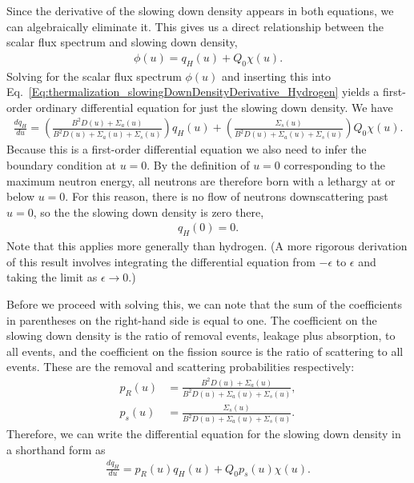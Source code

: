 Since the derivative of the slowing down density appears in both equations, we can algebraically eliminate it. This gives us a direct relationship between the scalar flux spectrum and slowing down density,
\begin{align}
  [ B^2 D(u) + \Sigma_a(u) + \Sigma_s(u) ] \phi(u) = q_H(u) + Q_0 \chi(u) . \label{Eq:thermalization_relationship_ScalarFlux_SlowingDownDensity_Hydrogen}
\end{align}
Solving for the scalar flux spectrum $\phi(u)$ and inserting this into Eq.~\eqref{Eq:thermalization_slowingDownDensityDerivative_Hydrogen} yields a first-order ordinary differential equation for just the slowing down density. We have
\begin{align}
  \frac{dq_H}{du} = \left( \frac{ B^2 D(u) + \Sigma_a(u) }{ B^2 D(u) + \Sigma_a(u) + \Sigma_s(u) } \right) q_H(u) + \left( \frac{ \Sigma_s(u) }{ B^2 D(u) + \Sigma_a(u) + \Sigma_s(u) } \right) Q_0 \chi(u).
\end{align}
Because this is a first-order differential equation we also need to infer the boundary condition at $u = 0$. By the definition of $u = 0$ corresponding to the maximum neutron energy, all neutrons are therefore born with a lethargy at or below $u = 0$. For this reason, there is no flow of neutrons downscattering past $u = 0$, so the the slowing down density is zero there,
\begin{align}
  q_H(0) = 0.
\end{align}
Note that this applies more generally than hydrogen. (A more rigorous derivation of this result involves integrating the differential equation from $-\epsilon$ to $\epsilon$ and taking the limit as $\epsilon \rightarrow 0$.)

Before we proceed with solving this, we can note that the sum of the coefficients in parentheses on the right-hand side is equal to one. The coefficient on the slowing down density is the ratio of removal events, leakage plus absorption, to all events, and the coefficient on the fission source is the ratio of scattering to all events. These are the removal and scattering probabilities respectively:
\begin{subequations}
\begin{align}
  p_R(u) &= \frac{ B^2 D(u) + \Sigma_a(u) }{ B^2 D(u) + \Sigma_a(u) + \Sigma_s(u) }, \\
  p_s(u) &= \frac{ \Sigma_s(u) }{ B^2 D(u) + \Sigma_a(u) + \Sigma_s(u) } . 
\end{align}
\end{subequations}
Therefore, we can write the differential equation for the slowing down density in a shorthand form as
\begin{align}
  \frac{dq_H}{du} = p_R(u) q_H(u) + Q_0 p_s(u) \chi(u).
\end{align}

